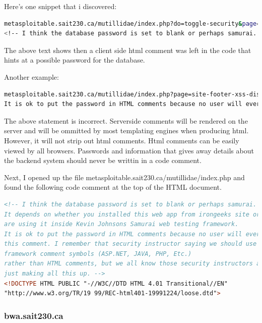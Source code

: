 \documentclass{article}
\begin{document}
Here's one snippet that i discovered:

\begin{lstlisting}[language=bash]
metasploitable.sait230.ca/mutillidae/index.php?do=toggle-security&page=user-info.php:2: \
<!-- I think the database password is set to blank or perhaps samurai.
\end{lstlisting}

The above text shows then a client side html comment was left in the code that hints at a possible password for the database.

Another example:

\begin{lstlisting}[language=Bash]
metasploitable.sait230.ca/mutillidae/index.php?page=site-footer-xss-discussion.php:5: \
It is ok to put the password in HTML comments because no user will ever see 
\end{lstlisting}

The above statement is incorrect. Serverside comments will be rendered on the server
and will be ommitted by most templating engines when producing html. However, it will
not strip out html comments. Html comments can be easily viewed by all browsers. Passwords
and information that gives away details about the backend system should never be
writtin in a code comment.

Next, I opened up the file metasploitable.sait230.ca/mutillidae/index.php and 
found the following code comment at the top of the HTML document.

\begin{lstlisting}[language=HTML]
<!-- I think the database password is set to blank or perhaps samurai.
It depends on whether you installed this web app from irongeeks site or
are using it inside Kevin Johnsons Samurai web testing framework. 
It is ok to put the password in HTML comments because no user will ever see 
this comment. I remember that security instructor saying we should use the
framework comment symbols (ASP.NET, JAVA, PHP, Etc.) 
rather than HTML comments, but we all know those security instructors are 
just making all this up. -->
<!DOCTYPE HTML PUBLIC "-//W3C//DTD HTML 4.01 Transitional//EN" 
"http://www.w3.org/TR/19 99/REC-html401-19991224/loose.dtd">
\end{lstlisting}

\subsubsection{bwa.sait230.ca}
\end{document}
